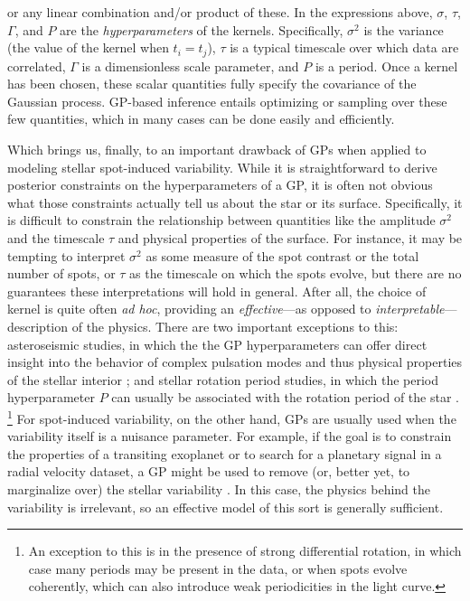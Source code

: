 \documentclass[modern]{aastex62}
\begin{document}
%
or any linear combination and/or product of these. In the expressions above,
$\sigma$, $\tau$, $\Gamma$, and $P$ are
the \emph{hyperparameters} of the kernels.
Specifically, $\sigma^2$ is the variance (the value
of the kernel when $t_i = t_j$), $\tau$ is a typical timescale over which
data are correlated, $\Gamma$ is a dimensionless scale parameter, and $P$ is
a period.
Once a kernel has been chosen, these scalar quantities fully
specify the covariance of the Gaussian process. GP-based inference
entails optimizing or sampling over these few quantities, which in many
cases can be done easily and efficiently.

Which brings us, finally, to an important drawback of GPs when applied
to modeling stellar spot-induced variability. While it is straightforward to derive
posterior constraints on the hyperparameters of a GP, it is often
not obvious what those constraints actually tell us about the star
or its surface.
Specifically, it is difficult to constrain the relationship between
quantities like the amplitude $\sigma^2$
and the timescale $\tau$ and physical properties of the surface.
For instance, it may be tempting to interpret $\sigma^2$ as some measure of the spot
contrast or the total number of spots, or $\tau$ as the timescale on which the
spots evolve, but there are no guarantees these interpretations will
hold in general. After all, the choice of kernel is quite often \emph{ad hoc},
providing an \emph{effective}---as opposed to \emph{interpretable}---description
of the physics.
%
There are two important exceptions to this: asteroseismic studies, in which the
the GP hyperparameters can offer direct insight into
the behavior of complex pulsation modes and thus physical properties of the
stellar interior \citep[e.g.,][]{BrewerStello2009,ForemanMackey2017}; and
stellar rotation period studies, in which the period hyperparameter $P$ can usually
be associated with the rotation period of the star \citep[e.g.,][]{Angus2018}.%
\footnote{An exception to this is in the presence of strong differential
    rotation, in which case many periods may be present in the data, or
    when spots evolve coherently, which can also introduce weak periodicities
    in the light curve.}
%
For spot-induced variability, on the other hand,
GPs are usually used
when the variability itself is a nuisance parameter. For example, if the
goal is to constrain the properties of a transiting exoplanet or to
search for a planetary signal in a radial velocity dataset, a GP might be
used to remove (or, better yet, to marginalize over) the stellar variability
\citep[e.g.,][]{Haywood2014,Rajpaul2015,Luger2017b}.
In this case, the physics behind the variability is irrelevant, so an
effective model of this sort is generally sufficient.
\end{document}
